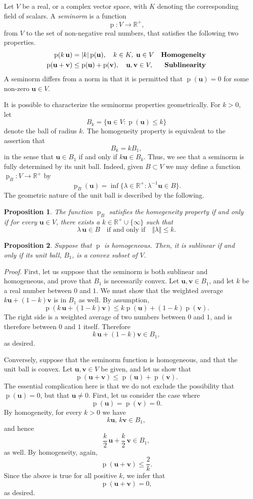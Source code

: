 \documentclass{article}
\newcommand{\reals}{\mathbb{R}}
\newtheorem{proposition}{Proposition}
\newcommand{\bu}{\mathbf{u}}
\newcommand{\bv}{\mathbf{v}}
\newcommand{\pnorm}{\operatorname{p}}
\newcommand{\snorm}[1]{\pnorm(#1)}
\begin{document}
Let $V$ be a real, or a complex vector space, with $K$ denoting the
corresponding field of scalars. A \emph{seminorm}  is a function
$$\operatorname{p}:V\to\reals^+,$$
from $V$ to the set of non-negative real numbers, that satisfies the
following two properties.
\begin{align*}
\snorm{k\, \bu} &= \vert k\vert \snorm{\bu},\quad k\in K,\; \bu\in V
& \text{\bf 
Homogeneity}\\
\snorm{\bu+\bv} &\leq \snorm{\bu}+\snorm{\bv},\quad \bu,\bv\in V,
&\text{\bf Sublinearity} 
\end{align*}
A seminorm differs from a norm in that it is permitted that $\snorm{\bu}=0$
for some non-zero $\bu\in V.$

It is possible to characterize the seminorms properties
geometrically. For $k>0$, let
$$B_k = \{ \bu \in V: \snorm{\bu}\leq k\}$$ denote
the ball of radius $k$. The homogeneity property is equivalent to the
assertion that
$$B_k = k B_1,$$
in the sense that
$\bu \in B_1$ if and only if
$k\bu\in B_k.$
Thus, we see that a seminorm is fully determined by its unit ball.
Indeed, given $B\subset V$ we may define a function
$\pnorm_B:V\to \reals^+$
by
$$\pnorm_B(\bu) = \inf\{ \lambda\in\reals^+ : \lambda^{-1}\bu\in B\}.$$
The geometric nature of the unit ball is described by the following.
\begin{proposition}
The function $\pnorm_B$ satisfies the homegeneity property if and only if
for every $\bu\in
V$, there exists a $k\in\reals^+\cup \{\infty\}$ such that
$$\lambda\,\bu \in B\quad\text{if and only if}\quad \Vert \lambda\Vert
\leq k.$$

\end{proposition}
\begin{proposition}
  Suppose that $\pnorm$ is homogeneous. Then, it is sublinear if and
  only if its unit ball, $B_1$, is a convex subset of $V$.
\end{proposition}
\emph{Proof.} First, let us suppose that the seminorm is both sublinear
and homogeneous, and prove that $B_1$ is necessarily convex. Let
$\bu,\bv\in B_1$, and let $k$ be a real number between $0$ and $1$.
We must show that the weighted average $k\bu+(1-k)\bv$ is in $B_1$ as
well. By assumption,
$$\snorm{k\,\bu +(1-k)\bv} \leq k\snorm{\bu} +(1-k)\snorm{\bv}.$$
The right side is a
weighted average of two numbers between $0$ and $1$, and is therefore
between $0$ and $1$ itself. Therefore
$$k\,\bu+(1-k)\bv \in B_1,$$
as desired.

Conversely, suppose that the seminorm function is homogeneous, and
that the unit ball is convex. Let $\bu,\bv\in
V$ be given, and let us show that
$$\snorm{\bu+\bv}\leq \snorm{\bu}+\snorm{\bv}.$$
The essential complication here is that we do not exclude the
possibility that $\snorm{\bu}=0$, but that $\bu\neq 0$.
First, let us consider the case where
$$\snorm{\bu}=\snorm{\bv}=0.$$
By homogeneity, for every $k>0$ we have
$$k\bu,\,k\bv\in B_1,$$
and hence
$$\frac{k}{2}\, \bu + \frac{k}{2}\,\bv\in B_1, $$
as well. By homogeneity, again,
$$\snorm{\bu+\bv}\leq \frac{2}{k}.$$
Since the above is true for all positive $k$, we infer that
$$\snorm{\bu+\bv} = 0,$$
as desired.
\end{document}
